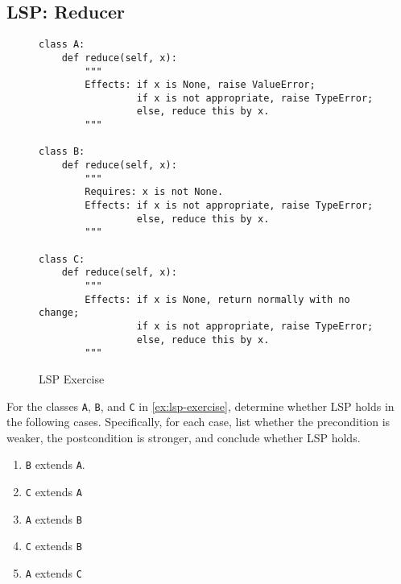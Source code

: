 \documentclass[oneside,11pt,dvipsnames]{book}
\newcommand{\sol}[1]{\iftoggle{usesol}{\textbf{Sol:} #1}{}}
\newcommand{\code}[1]{\texttt{#1}}
\begin{document}
\subsection{LSP: Reducer}
\begin{figure}
\begin{lstlisting}
class A:
    def reduce(self, x):
        """
        Effects: if x is None, raise ValueError;
                 if x is not appropriate, raise TypeError;
                 else, reduce this by x.
        """

class B:
    def reduce(self, x):
        """
        Requires: x is not None.
        Effects: if x is not appropriate, raise TypeError;
                 else, reduce this by x.
        """

class C:
    def reduce(self, x):
        """
        Effects: if x is None, return normally with no change;
                 if x is not appropriate, raise TypeError;
                 else, reduce this by x.
        """
\end{lstlisting}
\caption{LSP Exercise}\label{ex:lsp-exercise}
\end{figure}

For the classes \code{A}, \code{B}, and \code{C} in \autoref{ex:lsp-exercise}, determine whether LSP holds in the following cases. Specifically, for each case, list whether the precondition is weaker, the postcondition is stronger, and conclude whether LSP holds.
\begin{enumerate}
    \item \code{B} extends \code{A}.
    \sol{B's pre is stronger than A's because it requires that $x$ is not None while A's has no pre. \textbf{LSP does not hold}. The posts of \code{A} and \code{B} are the same}
    \item \code{C} extends \code{A}
    \sol{Pre's are the same (both are total methods). C's post is stronger than A's because it allows $x$ to be None while A's does not. \textbf{LSP holds}.}
    \item \code{A} extends \code{B}
    \sol{A's pre is weaker than B's because A has no pre. The posts for both are essentially the same because B's pre explicitly requires $x$ to be not None. \textbf{LSP holds}. Note that you might argue A's post is stronger, which is also fine and also means LSP holds.}
    \item \code{C} extends \code{B}
    \sol{C's pre is weaker than B's because C allows $x$ to be None while B does not. The posts are the same. \textbf{LSP does not hold}.}
    \item \code{A} extends \code{C}
\end{enumerate}
\end{document}
